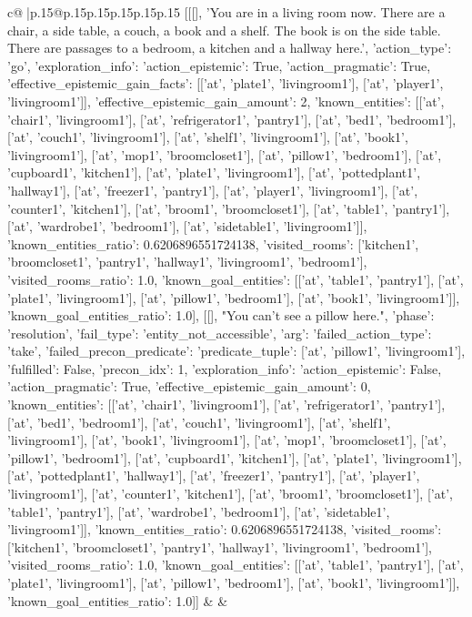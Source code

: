 \documentclass{article}
\begin{document}
{\begin{supertabular}{c@{$\;$}|p{.15\linewidth}@{}p{.15\linewidth}p{.15\linewidth}p{.15\linewidth}p{.15\linewidth}p{.15\linewidth}}
{{{	 [[[], 'You are in a living room now. There are a chair, a side table, a couch, a book and a shelf. The book is on the side table. There are passages to a bedroom, a kitchen and a hallway here.', {'action_type': 'go', 'exploration_info': {'action_epistemic': True, 'action_pragmatic': True, 'effective_epistemic_gain_facts': [['at', 'plate1', 'livingroom1'], ['at', 'player1', 'livingroom1']], 'effective_epistemic_gain_amount': 2, 'known_entities': [['at', 'chair1', 'livingroom1'], ['at', 'refrigerator1', 'pantry1'], ['at', 'bed1', 'bedroom1'], ['at', 'couch1', 'livingroom1'], ['at', 'shelf1', 'livingroom1'], ['at', 'book1', 'livingroom1'], ['at', 'mop1', 'broomcloset1'], ['at', 'pillow1', 'bedroom1'], ['at', 'cupboard1', 'kitchen1'], ['at', 'plate1', 'livingroom1'], ['at', 'pottedplant1', 'hallway1'], ['at', 'freezer1', 'pantry1'], ['at', 'player1', 'livingroom1'], ['at', 'counter1', 'kitchen1'], ['at', 'broom1', 'broomcloset1'], ['at', 'table1', 'pantry1'], ['at', 'wardrobe1', 'bedroom1'], ['at', 'sidetable1', 'livingroom1']], 'known_entities_ratio': 0.6206896551724138, 'visited_rooms': ['kitchen1', 'broomcloset1', 'pantry1', 'hallway1', 'livingroom1', 'bedroom1'], 'visited_rooms_ratio': 1.0, 'known_goal_entities': [['at', 'table1', 'pantry1'], ['at', 'plate1', 'livingroom1'], ['at', 'pillow1', 'bedroom1'], ['at', 'book1', 'livingroom1']], 'known_goal_entities_ratio': 1.0}}], [[], "You can't see a pillow here.", {'phase': 'resolution', 'fail_type': 'entity_not_accessible', 'arg': {'failed_action_type': 'take', 'failed_precon_predicate': {'predicate_tuple': ['at', 'pillow1', 'livingroom1'], 'fulfilled': False, 'precon_idx': 1}}, 'exploration_info': {'action_epistemic': False, 'action_pragmatic': True, 'effective_epistemic_gain_amount': 0, 'known_entities': [['at', 'chair1', 'livingroom1'], ['at', 'refrigerator1', 'pantry1'], ['at', 'bed1', 'bedroom1'], ['at', 'couch1', 'livingroom1'], ['at', 'shelf1', 'livingroom1'], ['at', 'book1', 'livingroom1'], ['at', 'mop1', 'broomcloset1'], ['at', 'pillow1', 'bedroom1'], ['at', 'cupboard1', 'kitchen1'], ['at', 'plate1', 'livingroom1'], ['at', 'pottedplant1', 'hallway1'], ['at', 'freezer1', 'pantry1'], ['at', 'player1', 'livingroom1'], ['at', 'counter1', 'kitchen1'], ['at', 'broom1', 'broomcloset1'], ['at', 'table1', 'pantry1'], ['at', 'wardrobe1', 'bedroom1'], ['at', 'sidetable1', 'livingroom1']], 'known_entities_ratio': 0.6206896551724138, 'visited_rooms': ['kitchen1', 'broomcloset1', 'pantry1', 'hallway1', 'livingroom1', 'bedroom1'], 'visited_rooms_ratio': 1.0, 'known_goal_entities': [['at', 'table1', 'pantry1'], ['at', 'plate1', 'livingroom1'], ['at', 'pillow1', 'bedroom1'], ['at', 'book1', 'livingroom1']], 'known_goal_entities_ratio': 1.0}}]] 
	  } 
	   } 
	   } 
	 & & \\ 
 


\end{supertabular}}
\end{document}
